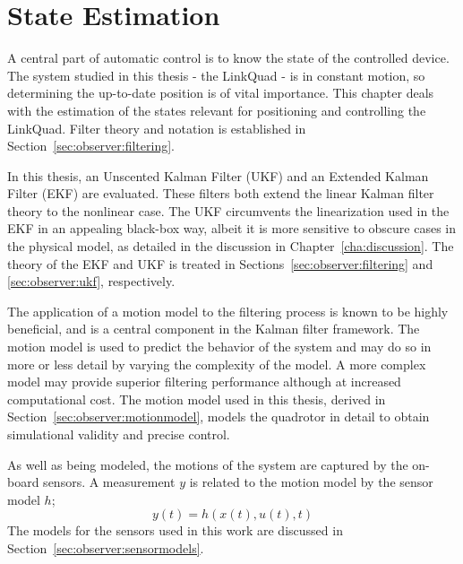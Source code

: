 \chapter{State Estimation}
\label{cha:observer}
    A central part of automatic control is to know the state of the controlled device.
    The system studied in this thesis - the LinkQuad - is in constant
    motion, so determining the up-to-date position is of vital importance.
    This chapter deals with the estimation of the states relevant for positioning
    and controlling the LinkQuad.
    Filter theory and notation is established in Section~\ref{sec:observer:filtering}.

    In this thesis, an Unscented Kalman Filter (UKF) and an Extended Kalman Filter (EKF) are evaluated.
    These filters both extend the linear Kalman filter theory to the nonlinear case.
    The UKF circumvents the linearization used in the EKF in an appealing black-box way,
    albeit it is more sensitive to obscure cases in the physical model,
    as detailed in the discussion in Chapter~\ref{cha:discussion}.
    The theory of the EKF and UKF is treated in
    Sections~\ref{sec:observer:filtering} and \ref{sec:observer:ukf}, respectively.

    The application of a motion model to the filtering process is known to
    be highly beneficial, and is a central component in the Kalman filter framework.
    The motion model is used to predict the behavior of the system and may do
    so in more or less detail by varying the complexity of the model.
    A more complex model may provide superior filtering performance although
    at increased computational cost. The motion model used in this thesis,
    derived in Section~\ref{sec:observer:motionmodel}, models the quadrotor
    in detail to obtain simulational validity and precise control.

    As well as being modeled, the motions of the system are captured by the on-board sensors.
    A measurement $y$ is related to the motion model by the sensor model $h$;
    \begin{equation}
        y(t) = h(x(t),u(t),t)
    \end{equation}
    The models for the sensors used in this work are discussed in Section~\ref{sec:observer:sensormodels}.

    
    
    
    
